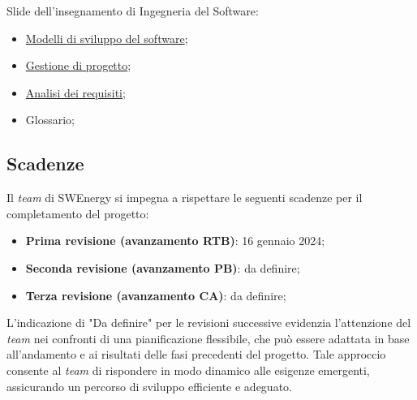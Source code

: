 Slide dell'insegnamento di Ingegneria del Software:
\begin{itemize}
	\item \href{https://www.math.unipd.it/~tullio/IS-1/2023/Dispense/T3.pdf}
	      {Modelli di sviluppo del software};
	\item \href{https://www.math.unipd.it/~tullio/IS-1/2023/Dispense/T4.pdf}
	      {Gestione di progetto};
	\item \href{https://www.math.unipd.it/~tullio/IS-1/2023/Dispense/T5.pdf}
	      {Analisi dei requisiti};
	\item Glossario;
\end{itemize}

\subsection{Scadenze}
Il \textit{team} di SWEnergy si impegna a rispettare le seguenti scadenze per il
completamento del progetto:
\begin{itemize}
	\item \textbf{Prima revisione (avanzamento RTB)}: 16 gennaio 2024;
	\item \textbf{Seconda revisione (avanzamento PB)}: da definire;
	\item \textbf{Terza revisione (avanzamento CA)}: da definire;
\end{itemize}

L'indicazione di "Da definire" per le revisioni successive evidenzia l'attenzione 
del \textit{team} nei confronti di una pianificazione flessibile, che può essere 
adattata in base all'andamento e ai risultati delle fasi precedenti del progetto. 
Tale approccio consente al \textit{team} di rispondere in modo dinamico alle esigenze emergenti, 
assicurando un percorso di sviluppo efficiente e adeguato.
